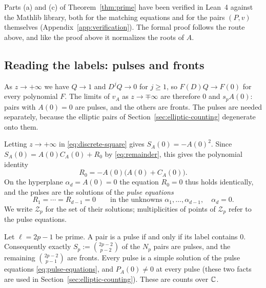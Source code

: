 \begin{remark}\label{rem:lean}
Parts (a) and (c) of Theorem~\ref{thm:prime} have been verified in
Lean~4 against the Mathlib library, both for the matching equations and
for the pairs \((P,v)\) themselves (Appendix~\ref{app:verification}).
The formal proof follows the route above, and like the proof above it
normalizes the roots of \(A\).
\end{remark}

\subsection{Reading the labels: pulses and fronts}\label{sec:labels}

As \(z\to+\infty\) we have \(Q\to1\) and \(D^jQ\to0\) for \(j\ge1\), so
\(F(D)Q\to F(0)\) for every polynomial \(F\). The limits of \(v_A\) as
\(z\to\mp\infty\) are therefore \(0\) and \(s_pA(0)\): pairs with
\(A(0)=0\) are pulses, and the others are fronts. The pulses are needed
separately, because the elliptic pairs of
Section~\ref{sec:elliptic-counting} degenerate onto them.

Letting \(z\to+\infty\) in \eqref{eq:discrete-square} gives
\(S_A(0)=-A(0)^2\). Since \(S_A(0)=A(0)C_A(0)+R_0\) by
\eqref{eq:remainder}, this gives the polynomial identity
\begin{equation}\label{eq:constant-remainder}
 R_0=-A(0)\bigl(A(0)+C_A(0)\bigr).
\end{equation}
On the hyperplane \(\alpha_d=A(0)=0\) the equation \(R_0=0\) thus holds
identically, and the pulses are the solutions of the \emph{pulse equations}
\begin{equation}\label{eq:pulse-equations}
 R_1=\cdots=R_{d-1}=0\qquad\text{in the unknowns }
 \alpha_1,\ldots,\alpha_{d-1},\quad\alpha_d=0 .
\end{equation}
We write \(\mathcal Z_p\) for the set of their solutions; multiplicities
of points of \(\mathcal Z_p\) refer to the pulse equations.

\begin{proposition}\label{cor:endpoints}
Let \(\ell=2p-1\) be prime. A pair is a pulse if and only if its label
contains \(0\). Consequently exactly \(S_p:=\binom{2p-2}{p-2}\)
of the \(N_p\) pairs are pulses, and the remaining
\(\binom{2p-2}{p-1}\) are fronts. Every pulse is a simple solution of
the pulse equations \eqref{eq:pulse-equations}, and
\(P_A(0)\ne0\) at every pulse (these two facts are used in
Section~\ref{sec:elliptic-counting}). These are counts over \(\mathbb C\).
\end{proposition}

